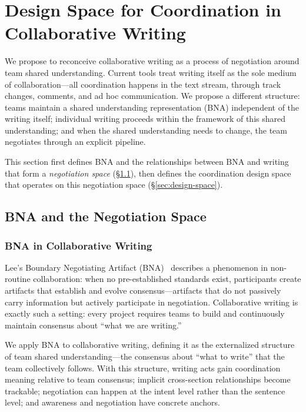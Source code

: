 \section{Design Space for Coordination in Collaborative Writing}
\label{sec:framework}

We propose to reconceive collaborative writing as a process of negotiation around team shared understanding. Current tools treat writing itself as the sole medium of collaboration---all coordination happens in the text stream, through track changes, comments, and ad hoc communication. We propose a different structure: teams maintain a shared understanding representation (BNA) independent of the writing itself; individual writing proceeds within the framework of this shared understanding; and when the shared understanding needs to change, the team negotiates through an explicit pipeline.

This section first defines BNA and the relationships between BNA and writing that form a \emph{negotiation space} (\S\ref{sec:bna}), then defines the coordination design space that operates on this negotiation space (\S\ref{sec:design-space}).


\subsection{BNA and the Negotiation Space}
\label{sec:bna}

\subsubsection{BNA in Collaborative Writing}

Lee's Boundary Negotiating Artifact (BNA)~\cite{lee2007boundary} describes a phenomenon in non-routine collaboration: when no pre-established standards exist, participants create artifacts that establish and evolve consensus---artifacts that do not passively carry information but actively participate in negotiation. Collaborative writing is exactly such a setting: every project requires teams to build and continuously maintain consensus about ``what we are writing.''

We apply BNA to collaborative writing, defining it as the externalized structure of team shared understanding---the consensus about ``what to write'' that the team collectively follows. With this structure, writing acts gain coordination meaning relative to team consensus; implicit cross-section relationships become trackable; negotiation can happen at the intent level rather than the sentence level; and awareness and negotiation have concrete anchors.

